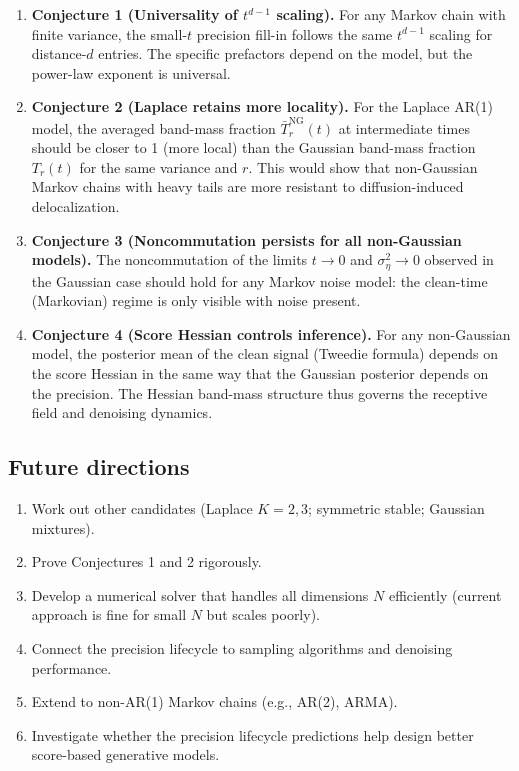 \documentclass[11pt,a4paper]{article}
\theoremstyle{plain}
\theoremstyle{definition}
\begin{document}
\begin{enumerate}

\item \textbf{Conjecture 1 (Universality of $t^{d-1}$ scaling).}
For any Markov chain with finite variance, the small-$t$ precision fill-in follows the same $t^{d-1}$ scaling for distance-$d$ entries. The specific prefactors depend on the model, but the power-law exponent is universal.

\item \textbf{Conjecture 2 (Laplace retains more locality).}
For the Laplace AR(1) model, the averaged band-mass fraction $\bar{T}_r^{\text{NG}}(t)$ at intermediate times should be closer to 1 (more local) than the Gaussian band-mass fraction $T_r(t)$ for the same variance and $r$. This would show that non-Gaussian Markov chains with heavy tails are more resistant to diffusion-induced delocalization.

\item \textbf{Conjecture 3 (Noncommutation persists for all non-Gaussian models).}
The noncommutation of the limits $t \to 0$ and $\sigma_\eta^2 \to 0$ observed in the Gaussian case should hold for any Markov noise model: the clean-time (Markovian) regime is only visible with noise present.

\item \textbf{Conjecture 4 (Score Hessian controls inference).}
For any non-Gaussian model, the posterior mean of the clean signal (Tweedie formula) depends on the score Hessian in the same way that the Gaussian posterior depends on the precision. The Hessian band-mass structure thus governs the receptive field and denoising dynamics.

\end{enumerate}

\subsection{Future directions}

\begin{enumerate}
\item Work out other candidates (Laplace $K=2,3$; symmetric stable; Gaussian mixtures).
\item Prove Conjectures 1 and 2 rigorously.
\item Develop a numerical solver that handles all dimensions $N$ efficiently (current approach is fine for small $N$ but scales poorly).
\item Connect the precision lifecycle to sampling algorithms and denoising performance.
\item Extend to non-AR(1) Markov chains (e.g., AR(2), ARMA).
\item Investigate whether the precision lifecycle predictions help design better score-based generative models.
\end{enumerate}
\end{document}
